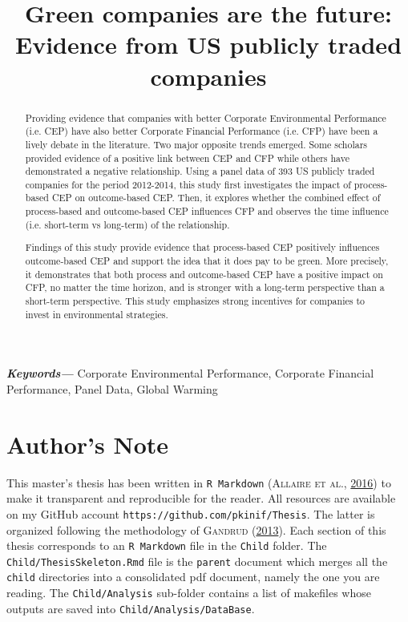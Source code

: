 \documentclass[12pt,]{article}
\begin{document}
\newpage


\begin{centering}
\huge
\title{Green companies are the future: Evidence from US publicly traded companies}

\maketitle

\normalsize
\begin{abstract}

Providing evidence that companies with better Corporate Environmental Performance (i.e. CEP) have also better Corporate Financial Performance (i.e. CFP) have been a lively debate in the literature.  Two major opposite trends emerged. Some scholars provided evidence of a positive link between CEP and CFP while others have demonstrated a negative relationship. Using a panel data of 393 US publicly traded companies for the period 2012-2014, this study first investigates the impact of process-based CEP on outcome-based CEP. Then, it explores whether the combined effect of process-based and outcome-based CEP influences CFP and observes the time influence (i.e. short-term vs long-term) of the relationship.

Findings of this study provide evidence that process-based CEP positively influences outcome-based CEP and support the idea that it does pay to be green. More precisely, it demonstrates that both process and outcome-based CEP have a positive impact on CFP, no matter the time horizon, and is stronger with a long-term perspective than a short-term perspective. This study emphasizes strong incentives for companies to invest in environmental strategies.

\end{abstract}
\providecommand{\keywords}[1]
{
  \small    
  \textbf{\textit{Keywords---}} #1
}
\keywords{Corporate Environmental Performance, Corporate Financial Performance, Panel Data, Global Warming}
\end{centering}

\newpage

\section*{Author's Note}

This master's thesis has been written in \texttt{R\ Markdown}
(\textsc{Allaire et al.}, \protect\hyperlink{ref-Allaire2016}{2016}) to
make it transparent and reproducible for the reader. All resources are
available on my GitHub account
\texttt{https://github.com/pkinif/Thesis}. The latter is organized
following the methodology of \textsc{Gandrud}
(\protect\hyperlink{ref-Gandrud2013b}{2013}). Each section of this
thesis corresponds to an \texttt{R\ Markdown} file in the \texttt{Child}
folder. The \texttt{Child/ThesisSkeleton.Rmd} file is the
\texttt{parent} document which merges all the \texttt{child} directories
into a consolidated pdf document, namely the one you are reading. The
\texttt{Child/Analysis} sub-folder contains a list of makefiles whose
outputs are saved into \texttt{Child/Analysis/DataBase}.
\end{document}
